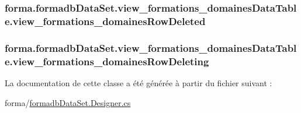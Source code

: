 \subsubsection[{\texorpdfstring{view\+\_\+formations\+\_\+domaines\+Row\+Deleted}{view_formations_domainesRowDeleted}}]{ forma.\+formadb\+Data\+Set.\+view\+\_\+formations\+\_\+domaines\+Data\+Table.\+view\+\_\+formations\+\_\+domaines\+Row\+Deleted}\hypertarget{classforma_1_1formadb_data_set_1_1view__formations__domaines_data_table_a9725d24a07ec5174fe54e237a9d420f6}{}\label{classforma_1_1formadb_data_set_1_1view__formations__domaines_data_table_a9725d24a07ec5174fe54e237a9d420f6}
\subsubsection[{\texorpdfstring{view\+\_\+formations\+\_\+domaines\+Row\+Deleting}{view_formations_domainesRowDeleting}}]{ forma.\+formadb\+Data\+Set.\+view\+\_\+formations\+\_\+domaines\+Data\+Table.\+view\+\_\+formations\+\_\+domaines\+Row\+Deleting}\hypertarget{classforma_1_1formadb_data_set_1_1view__formations__domaines_data_table_ad59e65c5eb32203536abc3aca6e9eca9}{}\label{classforma_1_1formadb_data_set_1_1view__formations__domaines_data_table_ad59e65c5eb32203536abc3aca6e9eca9}


La documentation de cette classe a été générée à partir du fichier suivant \+:\begin{DoxyCompactItemize}
\item 
forma/\hyperlink{formadb_data_set_8_designer_8cs}{formadb\+Data\+Set.\+Designer.\+cs}\end{DoxyCompactItemize}
